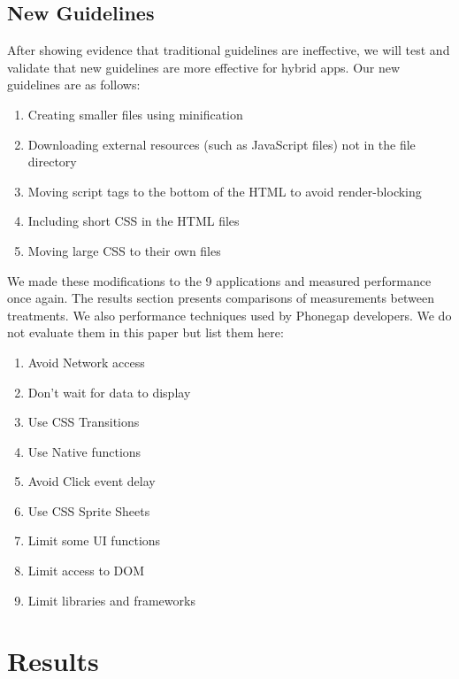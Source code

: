 \documentclass{acm_proc_article-sp}
\begin{document}
\subsection{New Guidelines}
After showing evidence that traditional guidelines are ineffective, we will test and validate that new guidelines are more effective for hybrid apps.
Our new guidelines are as follows:
\vspace{-1.0em}
\begin{enumerate}\itemsep1pt \parskip0pt 
	\item Creating smaller files using minification
	\item Downloading external resources (such as JavaScript files) not in the file directory 
    \item Moving script tags to the bottom of the HTML to avoid render-blocking
    \item Including short CSS in the HTML files
    \item Moving large CSS to their own files
\end{enumerate}
We made these modifications to the 9 applications and measured performance once again. The results section presents comparisons of measurements between treatments.
We also performance techniques used by Phonegap developers. We do not evaluate them in this paper but list them here:
\vspace{-1.0em}
\begin{enumerate}\itemsep1pt \parskip0pt 
	\item Avoid Network access
	\item Don't wait for data to display
	\item Use CSS Transitions
	\item Use Native functions
	\item Avoid Click event delay
	\item Use CSS Sprite Sheets
	\item Limit some UI functions
	\item Limit access to DOM
	\item Limit libraries and frameworks
\end{enumerate}
\section{Results}
\end{document}
